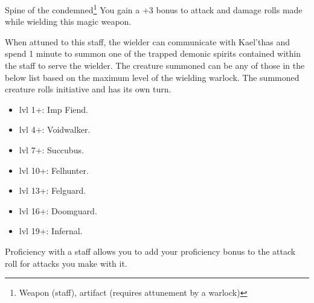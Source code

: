 \begin{commentbox}{Spine of the condemned\footnote{Weapon (staff), artifact (requires attunement by a warlock)}}
	You gain a +3 bonus to attack and damage rolls made while wielding this magic weapon. 
	
	When attuned to this staff, the wielder can communicate with Kael'thas and spend 1 minute to summon one of the trapped demonic spirits contained within the staff to serve the wielder. The creature summoned can be any of those in the below list based on the maximum level of the wielding warlock. The summoned creature rolls initiative and has its own turn.
	\begin{multicols}{4}
		\begin{itemize}
			\item lvl 1+: Imp Fiend.
			\item lvl 4+: Voidwalker. 
			\item lvl 7+: Succubus.
			\item lvl 10+: Felhunter. 
			\item lvl 13+: Felguard.
			\item lvl 16+: Doomguard.
			\item lvl 19+: Infernal.
		\end{itemize}
	\end{multicols}
	
	Proficiency with a staff allows you to add your proficiency bonus to the attack roll for attacks you make with it.
	

\end{commentbox}

